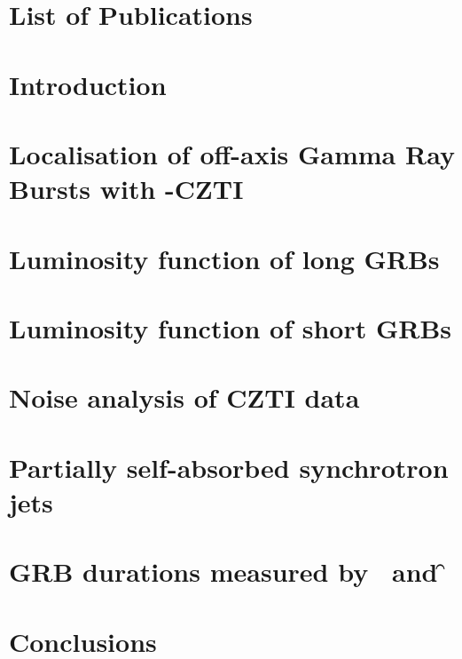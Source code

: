 \documentclass[12pt, %
english, %
singlespacing, %
2%
headsepline, %
]{MastersDoctoralThesis} %
\begin{document}
\chapter*{List of Publications}

\cleardoublepage






\mainmatter
\pagestyle{thesis}


\chapter{Introduction}
\label{chap:introduction}


\chapter[Localisation of off-axis CZTI GRBs]{Localisation of off-axis Gamma Ray Bursts with \AS-CZTI}
\label{chap:localisation}

	
\chapter{Luminosity function of long GRBs}
\label{chap:LGRBs}


\chapter{Luminosity function of short GRBs}
\label{chap:SGRBs}


\chapter{Noise analysis of CZTI data}
\label{chap:noise}


\chapter{Partially self-absorbed synchrotron jets}
\label{chap:jet_model}


\chapter{GRB durations measured by \s\ and \f}
\label{chap:ongoing}


\chapter{Conclusions}
\label{chap:conclusions}

\end{document}
